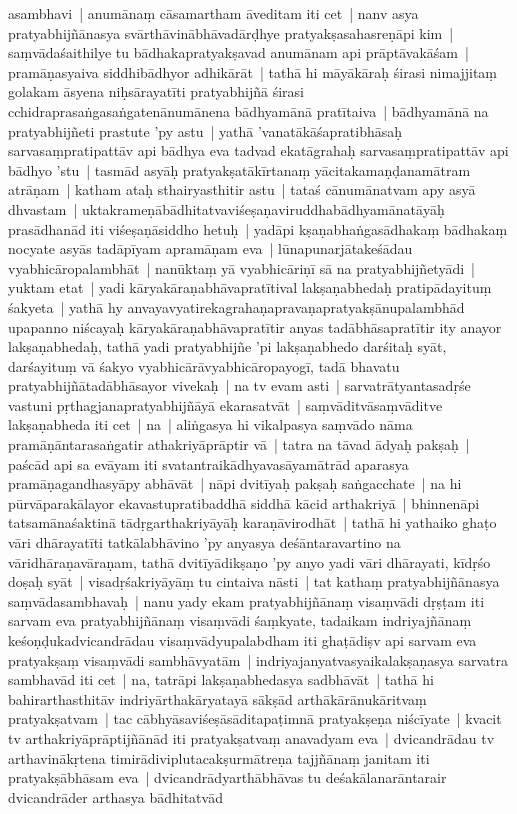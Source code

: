 \documentclass[article,12pt,a4paper]{memoir}%
\begin{document}
asambhavi | anumānaṃ cāsamartham āveditam iti cet | nanv asya pratyabhijñānasya svārthāvinābhāvadārḍhye pratyakṣasahasreṇāpi kim | saṃvādaśaithilye tu bādhakapratyakṣavad anumānam api prāptāvakāśam | pramāṇasyaiva siddhibādhyor adhikārāt | tathā hi māyākāraḥ śirasi nimajjitaṃ golakam āsyena niḥsārayatīti pratyabhijñā śirasi cchidraprasaṅgasaṅgatenānumānena bādhyamānā pratītaiva | bādhyamānā na pratyabhijñeti prastute 'py astu | \label{thakur75-116.23} yathā 'vanatākāśapratibhāsaḥ sarvasaṃpratipattāv api bādhya eva tadvad ekatāgrahaḥ sarvasaṃpratipattāv api bādhyo 'stu | tasmād asyāḥ pratyakṣatākīrtanaṃ yācitakamaṇḍanamātram atrāṇam | katham ataḥ sthairyasthitir astu | \label{thakur75-116.26} tataś cānumānatvam apy asyā dhvastam | uktakrameṇābādhitatvaviśeṣaṇaviruddhabādhyamānatāyāḥ prasādhanād iti viśeṣaṇāsiddho hetuḥ | \label{thakur75-116.27} yadāpi kṣaṇabhaṅgasādhakaṃ bādhakaṃ nocyate asyās tadāpīyam apramāṇam eva | lūnapunarjātakeśādau vyabhicāropalambhāt | \label{thakur75-1} nanūktaṃ yā vyabhicāriṇī sā na pratyabhijñetyādi | \label{thakur75-116.30} yuktam etat | yadi kāryakāraṇabhāvapratītival lakṣaṇabhedaḥ pratipādayituṃ śakyeta | yathā hy anvayavyatirekagrahaṇapravaṇapratyakṣānupalambhād upapanno niścayaḥ kāryakāraṇabhāvapratītir anyas tadābhāsapratītir ity anayor lakṣaṇabhedaḥ, tathā yadi pratyabhijñe 'pi lakṣaṇabhedo darśitaḥ syāt, darśayituṃ vā śakyo vyabhicārāvyabhicāropayogī, tadā bhavatu pratyabhijñātadābhāsayor vivekaḥ | na tv evam asti | sarvatrātyantasadṛśe vastuni pṛthagjanapratyabhijñāyā ekarasatvāt | \label{thakur75-117.3} saṃvāditvāsaṃvāditve lakṣaṇabheda iti cet | na | aliṅgasya hi vikalpasya saṃvādo nāma pramāṇāntarasaṅgatir athakriyāprāptir vā | \label{thakur75-117.4} tatra na tāvad ādyaḥ pakṣaḥ | paścād api sa evāyam iti svatantraikādhyavasāyamātrād aparasya pramāṇagandhasyāpy abhāvāt | \label{thakur75-117.6} nāpi dvitīyaḥ pakṣaḥ saṅgacchate | na hi pūrvāparakālayor ekavastupratibaddhā siddhā kācid arthakriyā | bhinnenāpi tatsamānaśaktinā tādṛgarthakriyāyāḥ karaṇāvirodhāt | tathā hi yathaiko ghaṭo vāri dhārayatīti tatkālabhāvino 'py anyasya deśāntaravartino na vāridhāraṇavāraṇam, tathā dvitīyādikṣaṇo 'py anyo yadi vāri dhārayati, kīdṛśo doṣaḥ syāt | visadṛśakriyāyāṃ tu cintaiva nāsti | tat kathaṃ pratyabhijñānasya saṃvādasambhavaḥ | \label{thakur75-117.12} nanu yady ekam pratyabhijñānaṃ visaṃvādi dṛṣṭam iti sarvam eva pratyabhijñānaṃ visaṃvādi śaṃkyate, tadaikam indriyajñānaṃ keśoṇḍukadvicandrādau visaṃvādyupalabdham iti ghaṭādiṣv api sarvam eva pratyakṣaṃ visaṃvādi sambhāvyatām | indriyajanyatvasyaikalakṣaṇasya sarvatra sambhavād iti cet | \label{thakur75-117.15} na, tatrāpi lakṣaṇabhedasya sadbhāvāt | tathā hi bahirarthasthitāv indriyārthakāryatayā sākṣād arthākārānukāritvaṃ pratyakṣatvam | tac cābhyāsaviśeṣāsāditapaṭimnā pratyakṣeṇa niścīyate | kvacit tv arthakriyāprāptijñānād iti pratyakṣatvaṃ anavadyam eva | dvicandrādau tv arthavinākṛtena timirādiviplutacakṣurmātreṇa tajjñānaṃ janitam iti pratyakṣābhāsam eva | dvicandrādyarthābhāvas tu deśakālanarāntarair dvicandrāder arthasya bādhitatvād 
\end{document}
